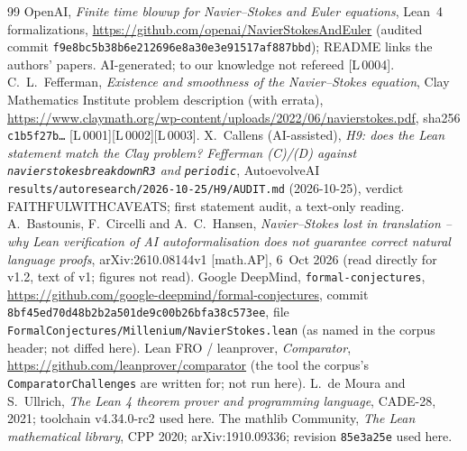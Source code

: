 \documentclass[10pt]{article}
\newcommand{\tg}[2]{\texorpdfstring{\textsf{[#1\,#2]}}{}}  %
\renewcommand{\_}{\textunderscore\allowbreak}
\begin{document}
\begin{thebibliography}{99}\small
{} OpenAI, \emph{Finite time blowup for Navier--Stokes and Euler equations}, Lean~4 formalizations, \url{https://github.com/openai/NavierStokesAndEuler} (audited commit \texttt{f9e8bc5b38b6e212696e8a30e3e91517af887bbd}); README links the authors' papers. AI-generated; to our knowledge not refereed \tg{L}{0004}.
 C.~L.~Fefferman, \emph{Existence and smoothness of the Navier--Stokes equation}, Clay Mathematics Institute problem description (with errata), \url{https://www.claymath.org/wp-content/uploads/2022/06/navierstokes.pdf}, sha256 \texttt{c1b5f27b\ldots} \tg{L}{0001}\tg{L}{0002}\tg{L}{0003}.
 X.~Callens (AI-assisted), \emph{H9: does the Lean statement match the Clay problem? Fefferman (C)/(D) against \texttt{navier\_stokes\_breakdown\_R3} and \texttt{\_periodic}}, AutoevolveAI \texttt{results/autoresearch/2026-10-25/H9/AUDIT.md} (2026-10-25), verdict FAITHFUL\_WITH\_CAVEATS; first statement audit, a text-only reading.
 A.~Bastounis, F.~Circelli and A.~C.~Hansen, \emph{Navier--Stokes lost in translation -- why Lean verification of AI autoformalisation does not guarantee correct natural language proofs}, arXiv:2610.08144v1 [math.AP], 6~Oct 2026 (read directly for v1.2, text of v1; figures not read).
 Google DeepMind, \texttt{formal-conjectures}, \url{https://github.com/google-deepmind/formal-conjectures}, commit \texttt{8bf45ed70d48b2b2a501de9c00b26bfa38c573ee}, file \texttt{FormalConjectures/Millenium/NavierStokes.lean} (as named in the corpus header; not diffed here).
 Lean FRO / leanprover, \emph{Comparator}, \url{https://github.com/leanprover/comparator} (the tool the corpus's \texttt{ComparatorChallenges} are written for; not run here).
 L.~de Moura and S.~Ullrich, \emph{The Lean 4 theorem prover and programming language}, CADE-28, 2021; toolchain v4.34.0-rc2 used here.
 The mathlib Community, \emph{The Lean mathematical library}, CPP 2020; arXiv:1910.09336; revision \texttt{85e3a25e} used here.
\end{thebibliography}
\end{document}
